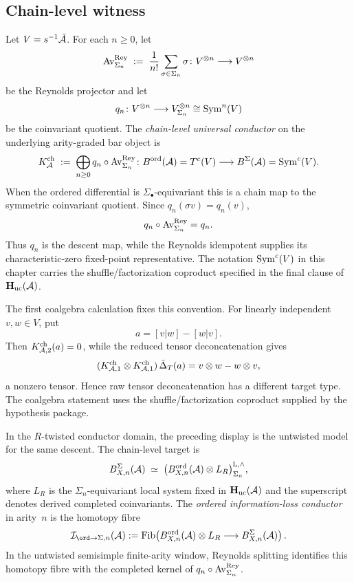 \subsection{Chain-level witness}
\label{subsec:uc-chain-level}

\begin{definition}
\label{def:uc-reynolds-coinvariant}
Let $V=s^{-1}\bar{\mathcal{A}}$. For each $n\geq 0$, let
\[
 \operatorname{Av}^{\mathrm{Rey}}_{\Sigma_n}
 \;:=\;
 \frac{1}{n!}\sum_{\sigma\in\Sigma_n}\sigma
 \colon
 V^{\otimes n}\longrightarrow V^{\otimes n}
\]
be the Reynolds projector and let
\[
 q_n \colon V^{\otimes n}\longrightarrow V^{\otimes n}_{\Sigma_n}
 \cong \operatorname{Sym}^n(V)
\]
be the coinvariant quotient. The \emph{chain-level universal
conductor} on the underlying arity-graded bar object is
\[
 K_{\mathcal{A}}^{\mathrm{ch}}
 \;:=\;
 \bigoplus_{n\geq 0} q_n\circ \operatorname{Av}^{\mathrm{Rey}}_{\Sigma_n}
 \colon
 B^{\mathrm{ord}}(\mathcal{A})=T^c(V)\longrightarrow B^{\Sigma}(\mathcal{A})=\operatorname{Sym}^c(V).
\]
When the ordered differential is $\Sigma_\bullet$-equivariant this is a
chain map to the symmetric coinvariant quotient.  Since
$q_n(\sigma v)=q_n(v)$,
\begin{equation}
\label{eq:uc-q-reynolds-is-q}
q_n\circ\operatorname{Av}^{\mathrm{Rey}}_{\Sigma_n}=q_n.
\end{equation}
Thus $q_n$ is the descent map, while the Reynolds idempotent supplies
its characteristic-zero fixed-point representative.  The notation
$\operatorname{Sym}^c(V)$ in this chapter carries the shuffle/factorization
coproduct specified in the final clause of
$\mathbf H_{\mathrm{uc}}(\mathcal{A})$.

The first coalgebra calculation fixes this convention.  For linearly
independent $v,w\in V$, put
\[
a=[v|w]-[w|v].
\]
Then $K^{\mathrm{ch}}_{\mathcal{A},2}(a)=0$, while the reduced tensor
deconcatenation gives
\[
(K^{\mathrm{ch}}_{\mathcal{A},1}\otimes K^{\mathrm{ch}}_{\mathcal{A},1})
\,\bar\Delta_T(a)=v\otimes w-w\otimes v,
\]
a nonzero tensor.  Hence raw tensor deconcatenation has a different
target type.  The coalgebra statement uses the
shuffle/factorization coproduct supplied by the hypothesis package.

In the $R$-twisted conductor domain, the preceding display is the
untwisted model for the same descent. The chain-level target is
\[
 B^{\Sigma}_{X,n}(\mathcal{A})
 \;\simeq\;
 \bigl(B^{\mathrm{ord}}_{X,n}(\mathcal{A})\otimes L_R\bigr)_{\Sigma_n}^{\mathbb L,\wedge},
\]
where $L_R$ is the $\Sigma_n$-equivariant local system fixed in
$\mathbf H_{\mathrm{uc}}(\mathcal{A})$ and the superscript denotes derived
completed coinvariants. The \emph{ordered information-loss conductor}
in arity~$n$ is the homotopy fibre
\[
 \mathcal I_{\ord\to\Sigma,n}(\cA)
 :=
 \operatorname{Fib}\!\left(
 B^{\Ord}_{X,n}(\cA)\otimes L_R
 \longrightarrow
 B^{\Sigma}_{X,n}(\cA)
 \right).
\]
In the untwisted semisimple finite-arity window, Reynolds splitting
identifies this homotopy fibre with the completed kernel of
$q_n\circ\operatorname{Av}^{\mathrm{Rey}}_{\Sigma_n}$.
\end{definition}


